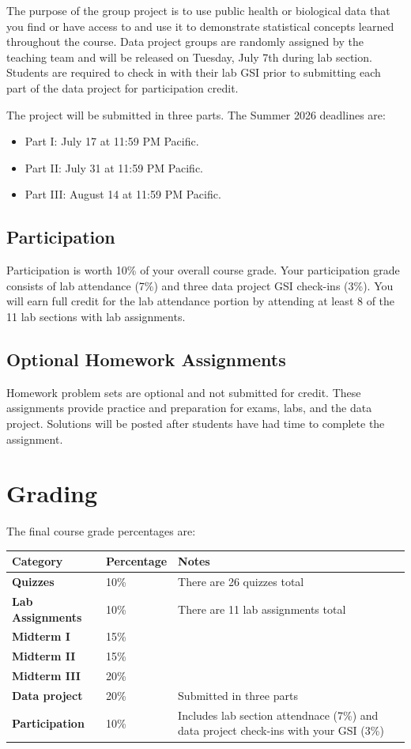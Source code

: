 \documentclass[11pt]{article}
\begin{document}
The purpose of the group project is to use public health or biological data
that you find or have access to and use it to demonstrate statistical concepts
learned throughout the course. Data project groups are randomly assigned by the teaching
team and will be released on Tuesday, July 7th during lab section. Students are 
required to check in with their lab GSI prior to submitting each part of the data 
project for participation credit.

The project will be submitted in three parts.
The Summer 2026 deadlines are:

\begin{itemize}
  \item Part I: July 17 at 11:59 PM Pacific.
  \item Part II: July 31 at 11:59 PM Pacific.
  \item Part III: August 14 at 11:59 PM Pacific.
\end{itemize}

\subsection*{Participation}

Participation is worth 10\% of your overall course grade. Your participation grade
consists of lab attendance (7\%) and three data project GSI check-ins (3\%). You 
will earn full credit for the lab attendance portion by attending at least 8 of the
11 lab sections with lab assignments.

\subsection*{Optional Homework Assignments}

Homework problem sets are optional and not submitted for credit. These assignments
provide practice and preparation for exams, labs, and the data project. Solutions 
will be posted after students have had time to complete the assignment.

\section*{Grading}

The final course grade percentages are:

\begin{tabularx}{\textwidth}{>{\bfseries}p{2.2in}p{1.2in}X}
\toprule
Category & Percentage & Notes\\
\midrule
Quizzes & 10\% & There are 26 quizzes total\\
Lab Assignments & 10\% & There are 11 lab assignments total\\
Midterm I & 15\% & \\
Midterm II & 15\% & \\
Midterm III & 20\% & \\
Data project & 20\% & Submitted in three parts\\
Participation & 10\% & Includes lab section attendnace (7\%) and data project check-ins with your GSI (3\%)\\
\bottomrule
\end{tabularx}
\end{document}
